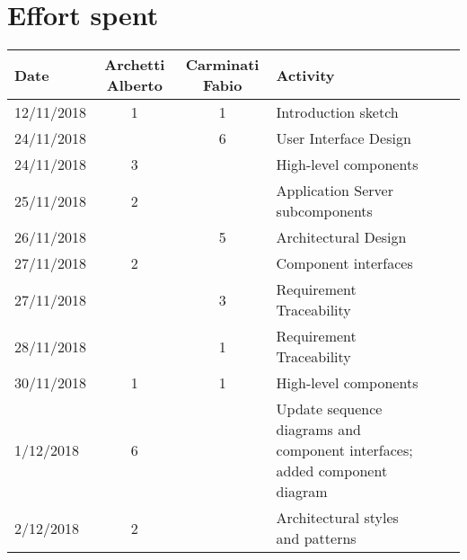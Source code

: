 \documentclass[../DD0.tex]{subfiles}
\newcommand{\addHours}[4]{#1 & #2 & #3 & #4 \\\hline}
\begin{document}
\section{Effort spent}
\label{sec:effort}
  \begin{table}[h!]
  \centering
  \begin{tabularx}{\linewidth}{|l|c|c|X|Xl}
    \hline
    \textbf{Date}  & \textbf{Archetti Alberto} & \textbf{Carminati Fabio} & \textbf{Activity} \\ \hline
    \addHours{12/11/2018}{1}{1}{Introduction sketch}
    \addHours{24/11/2018}{}{6}{User Interface Design}
    \addHours{24/11/2018}{3}{}{High-level components}
    \addHours{25/11/2018}{2}{}{Application Server subcomponents}
    \addHours{26/11/2018}{}{5}{Architectural Design}
    \addHours{27/11/2018}{2}{}{Component interfaces}
    \addHours{27/11/2018}{}{3}{Requirement Traceability}
    \addHours{28/11/2018}{}{1}{Requirement Traceability}
    \addHours{30/11/2018}{1}{1}{High-level components}
    \addHours{1/12/2018}{6}{}{Update sequence diagrams and component interfaces; added component diagram}
    \addHours{2/12/2018}{2}{}{Architectural styles and patterns}
  \end{tabularx}
\end{table}
\end{document}
